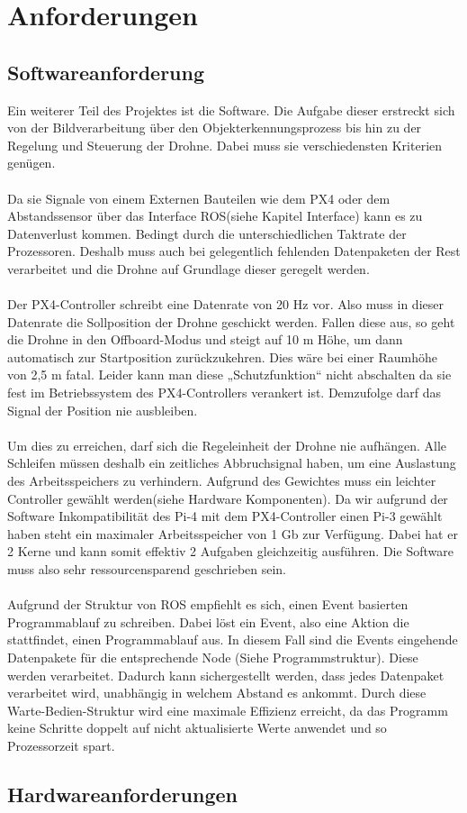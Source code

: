 \chapter{Anforderungen}
\section{Softwareanforderung}
Ein weiterer Teil des Projektes ist die Software. Die Aufgabe dieser erstreckt sich von der Bildverarbeitung über den Objekterkennungsprozess bis hin zu der Regelung und Steuerung der Drohne. Dabei muss sie verschiedensten Kriterien genügen.\\
\\
Da sie Signale von einem Externen Bauteilen wie dem PX4 oder dem Abstandssensor über das Interface ROS(siehe Kapitel Interface) kann es zu Datenverlust kommen. Bedingt durch die unterschiedlichen Taktrate der Prozessoren. Deshalb muss auch bei gelegentlich fehlenden Datenpaketen der Rest verarbeitet und die Drohne auf Grundlage dieser geregelt werden.\\
\\
Der PX4-Controller schreibt eine Datenrate von 20 Hz vor. Also muss in dieser Datenrate die Sollposition der Drohne geschickt werden. Fallen diese aus, so geht die Drohne in den Offboard-Modus und steigt auf 10 m Höhe, um dann automatisch zur Startposition zurückzukehren. Dies wäre bei einer Raumhöhe von 2,5 m fatal. Leider kann man diese „Schutzfunktion“ nicht abschalten da sie fest im Betriebssystem des PX4-Controllers verankert ist. Demzufolge darf das Signal der Position nie ausbleiben.\\
\\
Um dies zu erreichen, darf sich die Regeleinheit der Drohne nie aufhängen. Alle Schleifen müssen deshalb ein zeitliches Abbruchsignal haben, um eine Auslastung des Arbeitsspeichers zu verhindern. Aufgrund des Gewichtes muss ein leichter Controller gewählt werden(siehe Hardware Komponenten). Da wir aufgrund der Software Inkompatibilität des Pi-4 mit dem PX4-Controller einen Pi-3 gewählt haben steht ein maximaler Arbeitsspeicher von 1 Gb zur Verfügung. Dabei hat er 2 Kerne und kann somit effektiv 2 Aufgaben gleichzeitig ausführen. Die Software muss also sehr ressourcensparend geschrieben sein.\\
\\
Aufgrund der Struktur von ROS empfiehlt es sich, einen Event basierten Programmablauf zu schreiben. Dabei löst ein Event, also eine Aktion die stattfindet, einen Programmablauf aus. In diesem Fall sind die Events eingehende Datenpakete für die entsprechende Node (Siehe Programmstruktur). Diese werden verarbeitet. Dadurch kann sichergestellt werden, dass jedes Datenpaket verarbeitet wird, unabhängig in welchem Abstand es ankommt. Durch diese Warte-Bedien-Struktur wird eine maximale Effizienz erreicht, da das Programm keine Schritte doppelt auf nicht aktualisierte Werte anwendet und so Prozessorzeit spart.
\section{Hardwareanforderungen}